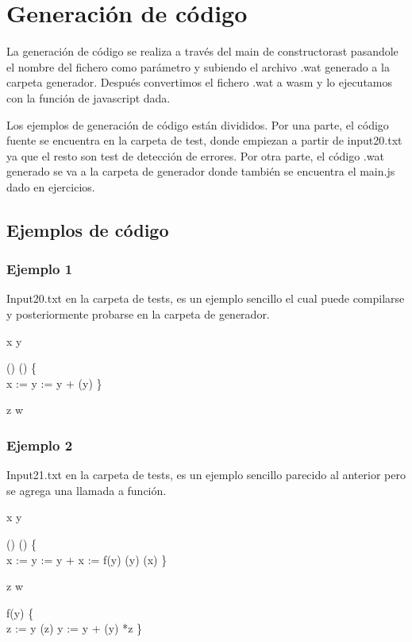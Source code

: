 \chapter{Generaci\'{o}n de c\'{o}digo}
\label{cap:conclusiones}

La generaci\'{o}n de c\'{o}digo se realiza a trav\'{e}s del main de constructorast pasandole el nombre del fichero como par\'{a}metro
y subiendo el archivo .wat generado a la carpeta generador. Despu\'{e}s convertimos el fichero .wat a wasm y lo ejecutamos con la funci\'{o}n de javascript dada.




Los ejemplos de generaci\'{o}n de c\'{o}digo est\'{a}n divididos. Por una parte, el c\'{o}digo fuente se encuentra en la carpeta de test, donde empiezan a partir de input20.txt ya que el resto son test de detecci\'{o}n de errores.
Por otra parte, el c\'{o}digo .wat generado se va a la carpeta de generador donde tambi\'{e}n se encuentra el main.js dado en ejercicios.

\section{Ejemplos de c\'{o}digo}

\subsection{Ejemplo 1}
Input20.txt en la carpeta de tests, es un ejemplo sencillo el cual puede compilarse y posteriormente probarse en la carpeta de generador.

\begin{algorithm}

	\Integer{} x  \;
	\Integer{} y  \;
	
	\Void() () \{ \\
	\quad x :=  \;
	\quad y := y + \;
	\quad {}(y)\;
	\}\;

 	\Integer{} z \;
	\Integer{} w \;
\end{algorithm}



\subsection{Ejemplo 2}
Input21.txt en la carpeta de tests, es un ejemplo sencillo parecido al anterior pero se agrega una llamada a funci\'{o}n.
\begin{algorithm}

	\Integer{} x  \;
	\Integer{} y  \;
	
	\Void() () \{ \\
	\quad x :=  \;
	\quad y := y + \;
	\quad x := f(y)\;
	\quad {}(y)\;
	\quad {}(x)\;
	\}\;

 	\Integer{} z \;
	\Integer{} w \;
	
	 f(y) \{ \\
	\quad z := y \;
	\quad {}(z) \;
	\quad y := y +  \;
	\quad {}(y) \;
	\quad {} *z \;
	\}\;
	
\end{algorithm}

